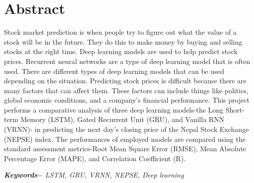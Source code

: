 

\setcounter{tocdepth}{3}
\setcounter{secnumdepth}{3}


\KECcoverpage  
\KECtitlepage
{} %



\chapter*{Abstract} %
Stock market prediction is when people try to figure out what the value of a stock will be in the future. They do this to make money by buying and selling stocks at the right time. Deep learning models are used to help predict stock prices. Recurrent neural networks are a type of deep learning model that is often used. There are different types of deep learning models that can be used depending on the situation. Predicting stock prices is difficult because there are many factors that can affect them. These factors can include things like politics, global economic conditions, and a company's financial performance. This project performs a comparative analysis of three deep learning models-the Long Short-term Memory (LSTM), Gated Recurrent Unit (GRU), and Vanilla RNN (VRNN)- in predicting the next day’s closing price of the Nepal Stock Exchange (NEPSE) index. The performances of employed models are compared using the standard assessment metrics-Root Mean Square Error (RMSE), Mean Absolute Percentage Error (MAPE), and Correlation Coefficient (R).
\par
\textbf{\textit{Keywords$-$}} \emph{LSTM, GRU, VRNN, NEPSE, Deep learning}

